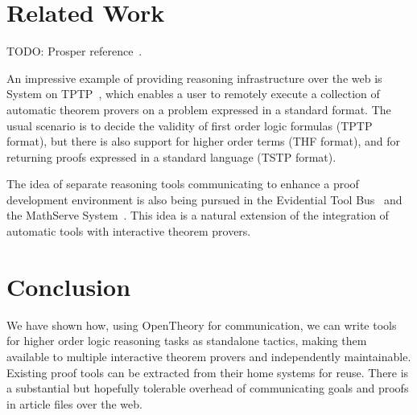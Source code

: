 \documentclass{llncs}
\newcommand{\OpenTheory}{OpenTheory\xspace}
\begin{document}



\section{Related Work}

TODO: Prosper reference~\cite{dennis2000}.

An impressive example of providing reasoning infrastructure over the web is System on TPTP~\cite{DBLP:conf/lpar/Sutcliffe10}, which enables a user to remotely execute a collection of automatic theorem provers on a problem expressed in a standard format.
The usual scenario is to decide the validity of first order logic formulas (TPTP format), but there is also support for higher order terms (THF format), and for returning proofs expressed in a standard language (TSTP format).

The idea of separate reasoning tools communicating to enhance a proof development environment is also being pursued in the Evidential Tool Bus~\cite{DBLP:conf/icfem/Rushby05} and the MathServe System~\cite{DBLP:conf/cade/ZimmerA06}.
This idea is a natural extension of the integration of automatic tools with interactive theorem provers.

\section{Conclusion}

We have shown how, using \OpenTheory for communication, we can write tools for higher order logic reasoning tasks as standalone tactics, making them available to multiple interactive theorem provers and independently maintainable.
Existing proof tools can be extracted from their home systems for reuse.
There is a substantial but hopefully tolerable overhead of communicating goals and proofs in article files over the web.



\end{document}
